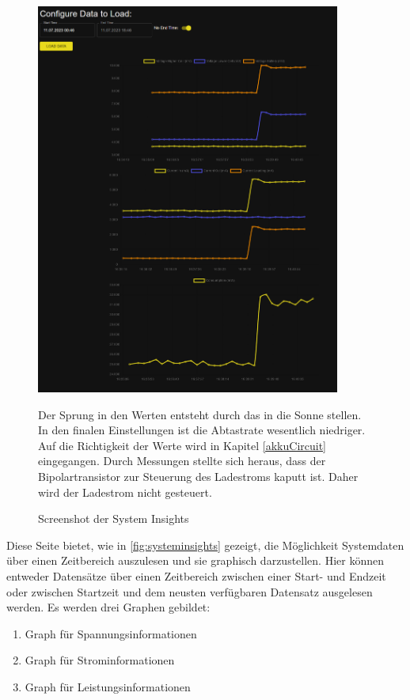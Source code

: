 \begin{figure}[htpb] %
    \begin{center}
    \includegraphics[width=10cm,keepaspectratio=true]{pics/Screenshot_ApplicationInsights.png}
    \caption{Screenshot der System Insights}
    \label{fig:systeminsights}
	\end{center}
    Der Sprung in den Werten entsteht durch das in die Sonne stellen.
   	In den finalen Einstellungen ist die Abtastrate wesentlich niedriger.
   	Auf die Richtigkeit der Werte wird in Kapitel \autoref{akkuCircuit} eingegangen.
   	Durch Messungen stellte sich heraus, dass der Bipolartransistor zur Steuerung des Ladestroms kaputt ist.
   	Daher wird der Ladestrom nicht gesteuert.
\end{figure}

Diese Seite bietet, wie in \autoref{fig:systeminsights} gezeigt, die Möglichkeit Systemdaten über einen Zeitbereich auszulesen und sie graphisch darzustellen.
Hier können entweder Datensätze über einen Zeitbereich zwischen einer Start- und Endzeit oder zwischen Startzeit und dem neusten verfügbaren Datensatz ausgelesen werden.
Es werden drei Graphen gebildet:
\begin{enumerate}
    \item Graph für Spannungsinformationen
    \item Graph für Strominformationen
    \item Graph für Leistungsinformationen
\end{enumerate}

